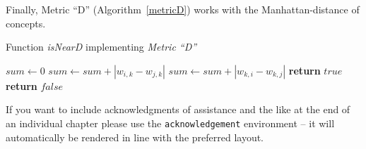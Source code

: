 \documentclass[graybox]{svmult}
\begin{document}
Finally, Metric ``D'' (Algorithm~\ref{metricD}) works with the Manhattan-distance of concepts.

\begin{algorithm}
  \caption{Function \emph{isNearD} implementing \emph{Metric ``D''}}\label{metricD}
  \begin{algorithmic}[1]
      \State $sum \gets 0$
          \State $sum \gets sum + |w_{i, k} - w_{j, k}|$
          \State $sum \gets sum + |w_{k, i} - w_{k, j}|$
        \EndIf
      \EndFor
        \State \textbf{return} $true$
      \Else
        \State \textbf{return} $false$
      \EndIf
    \EndFunction
  \end{algorithmic}
\end{algorithm}

\begin{acknowledgement}
If you want to include acknowledgments of assistance and the like at the end of an individual chapter please use the \verb|acknowledgement| environment -- it will automatically be rendered in line with the preferred layout.
\end{acknowledgement}


\end{document}
